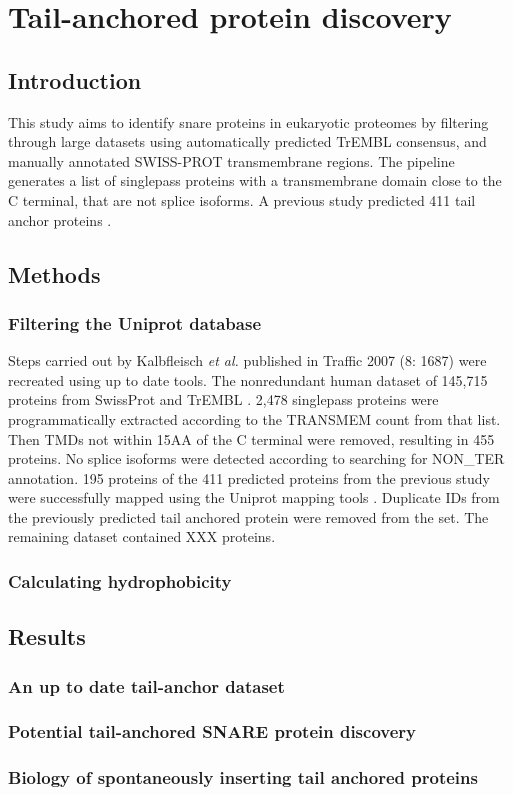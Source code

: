 \chapter{Tail-anchored protein discovery} %
\section{Introduction}
This study aims to identify \gls{snare} proteins in eukaryotic proteomes by filtering through large datasets using automatically predicted TrEMBL consensus, and manually annotated SWISS-PROT transmembrane regions. The pipeline generates a list of singlepass proteins with a transmembrane domain close to the C terminal, that are not splice isoforms. A previous study predicted 411 tail anchor proteins \cite{Kalbfleisch2007}.
\section{Methods}
\subsection{Filtering the Uniprot database}
Steps carried out by Kalbfleisch {\it et al.} published in Traffic 2007 (8: 1687) were recreated using up to date tools. The non\-redundant human dataset of 145,715 proteins from SwissProt and TrEMBL \cite{Kalbfleisch2007, TheUniProtConsortium2014}. 2,478 singlepass proteins were programmatically extracted according to the TRANSMEM count from that list. Then TMDs not within 15AA of the C terminal were removed, resulting in 455 proteins. No splice isoforms were detected according to searching for NON\_TER annotation. 195 proteins of the 411 predicted proteins from the previous study were successfully mapped using the Uniprot mapping tools \cite{Kalbfleisch2007, TheUniProtConsortium2014}. Duplicate IDs from the previously predicted tail anchored protein were removed from the set. The remaining dataset contained XXX proteins.

\subsection{Calculating hydrophobicity}

\section{Results}

\subsection{An up to date tail-anchor dataset}

\subsection{Potential tail-anchored SNARE protein discovery}

\subsection{Biology of spontaneously inserting tail anchored proteins}
